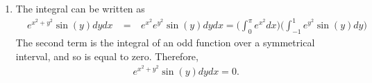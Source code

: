 \documentclass{article}
\begin{document}
\begin{enumerate}
\item %
The integral can be written as
\begin{align*}
  \mathop{\int_0^{\pi} \!\! \int_{-1}^1} e^{x^2 + y^2}\sin(y) dydx 
  &= \mathop{\int_0^{\pi} \!\! \int_{-1}^1} e^{x^2}e^{y^2}\sin(y) dydx  = \Bigg( \int_0^{\pi} e^{x^2} dx \Bigg)\Bigg( \int_{-1}^1 e^{y^2}\sin(y)dy \Bigg)  
\end{align*}
The second term is the integral of an odd function over a symmetrical interval, and so is equal to zero. Therefore,
\begin{align*}
  \mathop{\int_0^{\pi} \!\! \int_{-1}^1} e^{x^2 + y^2}\sin(y) dydx =0.
\end{align*}


\end{enumerate}
\end{document}
